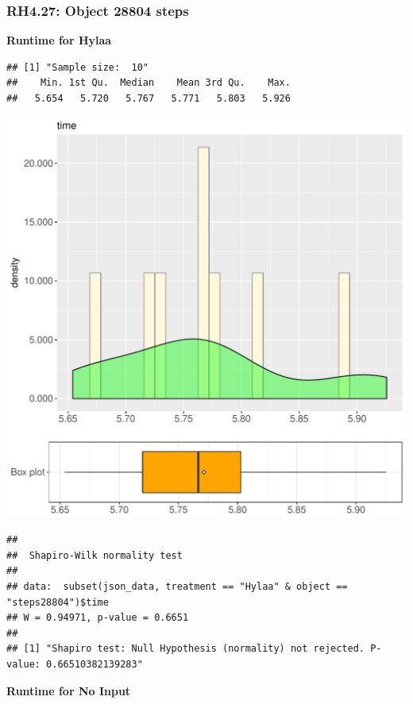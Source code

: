 \documentclass{article}\usepackage[]{graphicx}\usepackage[]{color}
\makeatletter
\def\maxwidth{ %
  \ifdim\Gin@nat@width>\linewidth
    \linewidth
  \else
    \Gin@nat@width
  \fi
}
\newenvironment{kframe}{%
 \def\at@end@of@kframe{}%
 \ifinner\ifhmode%
  \def\at@end@of@kframe{\end{minipage}}%
  \begin{minipage}{\columnwidth}%
 \fi\fi%
 \def\FrameCommand##1{\hskip\@totalleftmargin \hskip-\fboxsep
 \colorbox{shadecolor}{##1}\hskip-\fboxsep
     \hskip-\linewidth \hskip-\@totalleftmargin \hskip\columnwidth}%
 \MakeFramed {\advance\hsize-\width
   \@totalleftmargin\z@ \linewidth\hsize
   \@setminipage}}%
 {\par\unskip\endMakeFramed%
 \at@end@of@kframe}
\newenvironment{knitrout}{}{} %
\makeatother
\begin{document}
\subsubsection{RH4.27: Object 28804 steps}

 \textbf{Runtime for Hylaa}
\begin{knitrout}
\color{fgcolor}\begin{kframe}
\begin{verbatim}
## [1] "Sample size:  10"
##    Min. 1st Qu.  Median    Mean 3rd Qu.    Max. 
##   5.654   5.720   5.767   5.771   5.803   5.926
\end{verbatim}
\end{kframe}
\includegraphics[width=\maxwidth]{figure/RH4_Hylaa_steps28804-1} 
\begin{kframe}\begin{verbatim}
## 
## 	Shapiro-Wilk normality test
## 
## data:  subset(json_data, treatment == "Hylaa" & object == "steps28804")$time
## W = 0.94971, p-value = 0.6651
## 
## [1] "Shapiro test: Null Hypothesis (normality) not rejected. P-value: 0.66510382139283"
\end{verbatim}
\end{kframe}
\end{knitrout}
 \textbf{Runtime for No Input}
\end{document}
